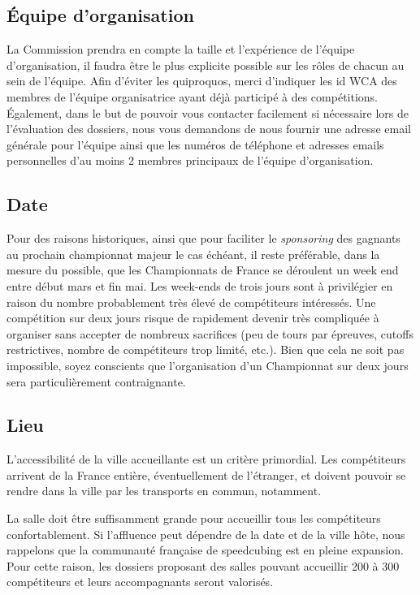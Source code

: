 \documentclass[a4paper,12pt]{scrartcl}
\begin{document}
\subsection*{Équipe d'organisation}

La Commission prendra en compte la taille et l'expérience de l'équipe d'organisation, il faudra être le plus explicite possible sur les rôles de chacun au sein de l'équipe. Afin d'éviter les quiproquos, merci d'indiquer les id WCA des membres de l'équipe organisatrice ayant déjà participé à des compétitions. Également, dans le but de pouvoir vous contacter facilement si nécessaire lors de l'évaluation des dossiers, nous vous demandons de nous fournir une adresse email générale pour l'équipe ainsi que les numéros de téléphone et adresses emails personnelles d'au moins 2 membres principaux de l'équipe d'organisation.


\subsection*{Date}

Pour des raisons historiques, ainsi que pour faciliter le \emph{sponsoring} des gagnants au prochain championnat majeur le cas échéant, il reste préférable, dans la mesure du possible, que les Championnats de France se déroulent un week end entre début mars et fin mai.
Les week-ends de trois jours sont à privilégier en raison du nombre probablement très élevé de compétiteurs intéressés. Une compétition sur deux jours risque de rapidement devenir très compliquée à organiser sans accepter de nombreux sacrifices (peu de tours par épreuves, cutoffs restrictives, nombre de compétiteurs trop limité, etc.). Bien que cela ne soit pas impossible, soyez conscients que l'organisation d'un Championnat sur deux jours sera particulièrement contraignante.

\subsection*{Lieu}

L'accessibilité de la ville accueillante est un critère primordial. Les compétiteurs arrivent de la France entière, éventuellement de l'étranger, et doivent pouvoir se rendre dans la ville par les transports en commun, notamment.

La salle doit être suffisamment grande pour accueillir tous les compétiteurs confortablement.
Si l'affluence peut dépendre de la date et de la ville hôte, nous rappelons que la communauté française de speedcubing est en pleine expansion. Pour cette raison, les dossiers proposant des salles pouvant accueillir 200 à 300 compétiteurs et leurs accompagnants seront valorisés.
\end{document}
